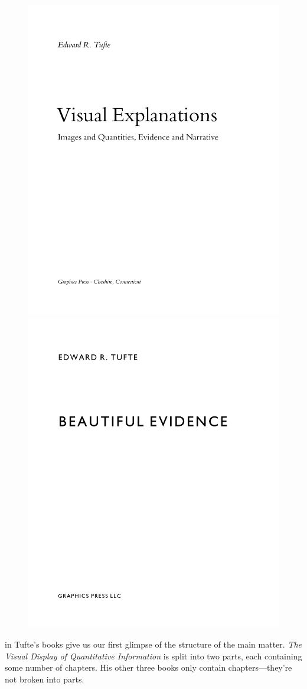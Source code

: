 \documentclass[
  twoside,
  symmetric]{tufte-book}
\newcommand{\VDQI}{\textit{The Visual Display of Quantitative Information}\xspace}
\begin{document}
\begin{figure}
\includegraphics[width=0.45\linewidth,height=\textheight,keepaspectratio]{style-guide/graphics/ve-title.pdf}
\includegraphics[width=0.45\linewidth,height=\textheight,keepaspectratio]{style-guide/graphics/be-title.pdf}

\end{figure}%

 in Tufte's books give us our first
glimpse of the structure of the main matter. \VDQI is split into two
parts, each containing some number of chapters. His other three books
only contain chapters---they're not broken into parts.
\end{document}
